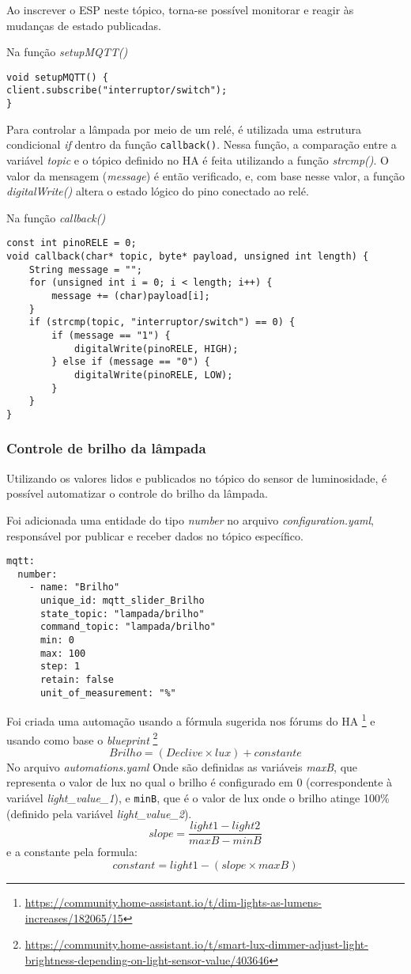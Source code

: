 \documentclass[]{abntex2}
\begin{document}
Ao inscrever o ESP neste tópico, torna-se possível monitorar e reagir às
mudanças de estado publicadas.

Na função \textit{setupMQTT()}

\begin{verbatim}
void setupMQTT() {
client.subscribe("interruptor/switch");
}
\end{verbatim}

Para controlar a lâmpada por meio de um relé, é utilizada uma estrutura
condicional \textit{if} dentro da função \texttt{callback()}.
Nessa função, a comparação entre a variável \textit{topic} e o tópico definido
no HA é feita utilizando a função \textit{strcmp()}.
O valor da mensagem (\textit{message}) é então verificado, e, com base nesse
valor, a função \textit{digitalWrite()} altera o estado lógico do pino
conectado ao relé.

Na função \textit{callback()}
\begin{verbatim}
const int pinoRELE = 0;
void callback(char* topic, byte* payload, unsigned int length) {
	String message = "";
	for (unsigned int i = 0; i < length; i++) {
		message += (char)payload[i];
	}
	if (strcmp(topic, "interruptor/switch") == 0) {
		if (message == "1") {
			digitalWrite(pinoRELE, HIGH);
		} else if (message == "0") {
			digitalWrite(pinoRELE, LOW);
		}
	}
}
\end{verbatim}
\subsubsection{Controle de brilho da lâmpada}
Utilizando os valores lidos e publicados no tópico do sensor de luminosidade, é
possível automatizar o controle do brilho da lâmpada.

Foi adicionada uma entidade do tipo \textit{number} no arquivo
\textit{configuration.yaml}, responsável por publicar e receber dados no tópico
específico.
\begin{verbatim}
mqtt:
  number:
    - name: "Brilho"
      unique_id: mqtt_slider_Brilho
      state_topic: "lampada/brilho"
      command_topic: "lampada/brilho"
      min: 0
      max: 100
      step: 1
      retain: false
      unit_of_measurement: "%"
\end{verbatim}
Foi criada uma automação usando a fórmula sugerida nos fórums do HA
\footnote{\url{https://community.home-assistant.io/t/dim-lights-as-lumens-increases/182065/15}}
e usando como base o \textit{blueprint} \footnote{\url{https://community.home-assistant.io/t/smart-lux-dimmer-adjust-light-brightness-depending-on-light-sensor-value/403646}}
\[
	Brilho = (Declive \times  lux) + constante
\]
No arquivo \textit{automations.yaml} Onde são definidas as variáveis
\textit{maxB}, que representa o valor de lux no qual o brilho é configurado em
0 (correspondente à variável \textit{light\_value\_1}), e \texttt{minB}, que é o
valor de lux onde o brilho atinge 100\% (definido pela variável
\textit{light\_value\_2}).\[
slope= \frac{light1 - light2}{maxB - minB}
\]
e a constante pela formula:
\[
constant = light1 - (slope \times maxB)
\]
\end{document}
